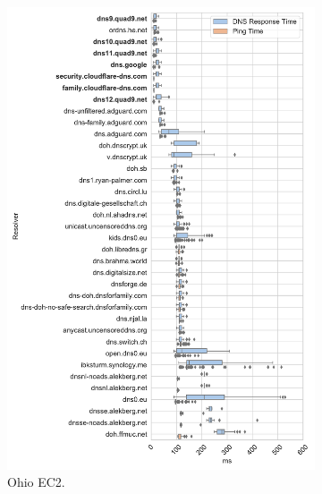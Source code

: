 \begin{figure}[h!]
\begin{subfigure}[b]{0.4\textwidth}
\includegraphics[width=\textwidth]{figures/ohio_eur.pdf}
\caption{Ohio EC2.}
\end{subfigure}
%
\hfill \\
\begin{subfigure}[b]{0.4\textwidth}

\end{subfigure}
\end{figure}
